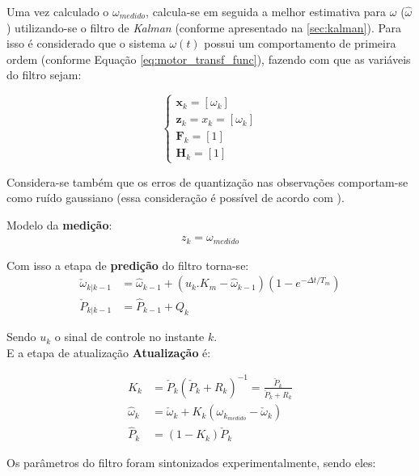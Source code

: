 Uma vez calculado o $\omega_{medido}$, calcula-se em 
seguida a melhor estimativa para $\omega$ ($\hat{\omega}$) 
utilizando-se o filtro de \emph{Kalman} (conforme apresentado na \autoref{sec:kalman}). 
Para isso é considerado que o sistema $\omega(t)$ possui um comportamento de primeira ordem 
(conforme Equação \ref{eq:motor_transf_func}), fazendo com que as variáveis do filtro sejam:

\begin{equation*}
\begin{cases}
    \textbf{x}_k = \left[ \omega_k \right]\\
    \textbf{z}_k = x_k = [\omega_k]\\
    \textbf{F}_k = [1]\\
    \textbf{H}_k = [1]
\end{cases}
\end{equation*}

Considera-se também que os erros de quantização nas observações comportam-se como ruído gaussiano (essa consideração é possível de acordo com \cite{quantization_error_is_a_gaussian}).

Modelo da \textbf{medição}:
\begin{align*}
z_k = \omega_{medido}
\end{align*}

Com isso a etapa de \textbf{predição} do filtro torna-se:
\begin{align*}
    \check{\omega}_{k|k-1} &= \hat{\omega}_{k-1} + (u_k.K_m - \hat{\omega}_{k-1})\left( 1 - e^{-\Delta{t}/T_m} \right)\\
    \check{P}_{k|k-1} &= \hat{P}_{k-1} + Q_k
\end{align*}

Sendo $u_k$ o sinal de controle no instante $k$.\\

E a etapa de atualização \textbf{Atualização} é:

\begin{align*}
K_k &= \check{P}_k \left( \check{P}_k + R_k \right)^{-1} = \frac{\check{P}_k}{\check{P}_k + R_k}\\
\hat{\omega}_k &= \check{\omega}_k + K_k \left( \omega_{k_{medido}} - \check{\omega}_k \right)\\
\hat{P}_k &= \left( 1 - K_k \right) \check{P}_k
\end{align*}

Os parâmetros do filtro foram sintonizados experimentalmente, sendo eles:

